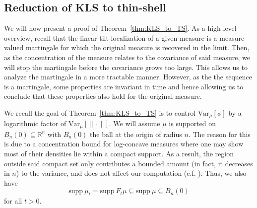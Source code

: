 \subsection{Reduction of KLS to thin-shell}\label{sec:KLS_to_TS}

We will now present a proof of Theorem~\ref{thm:KLS_to_TS}.
As a high level overview, recall that the linear-tilt localization of a given measure is a measure-valued martingale
for which the original measure is recovered in the limit. Then, as the concentration of the measure 
relates to the covariance of said measure, we will stop the martingale before the covariance grows too large. 
This allows us to analyze the martingale in a more tractable manner. However, as the the sequence is 
a martingale, some properties are invariant in time and hence allowing us to conclude that these properties 
also hold for the original measure.

We recall the goal of Theorem~\ref{thm:KLS_to_TS} is to control \(\text{Var}_\mu[\phi]\) by 
a logarithmic factor of \(\text{Var}_\mu[\|\cdot\|]\). We will assume \(\mu\) is supported on 
\(B_n(0) \subseteq \mathbb{R}^n\) with 
\(B_n(0)\) the ball at the origin of radius \(n\). The reason for this is due to a concentration 
bound for log-concave measures where one may show most of their densities lie within a compact support.
As a result, the region outside said compact set only contributes a bounded amount (in fact, it decreases 
in \(n\)) to the variance, and does not affect our computation (c.f. \cite{Klartag_2006}). 
Thus, we also have 
\[\text{supp}\ \mu_t = \text{supp}\ F_t\mu \subseteq \text{supp}\ \mu \subseteq B_n(0)\] 
for all \(t > 0\).
 
